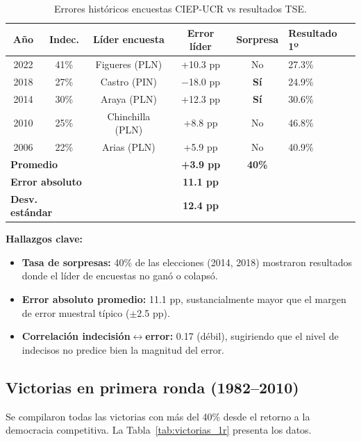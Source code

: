 \documentclass[11pt,a4paper]{article}
\begin{document}
\begin{table}[H]
\centering
\caption{Errores históricos encuestas CIEP-UCR vs resultados TSE.}
\label{tab:errores_historicos}
\begin{tabular}{@{}cccccl@{}}
\toprule
\textbf{Año} & \textbf{Indec.} & \textbf{Líder encuesta} & \textbf{Error líder} & \textbf{Sorpresa} & \textbf{Resultado 1º} \\
\midrule
2022 & 41\% & Figueres (PLN) & +10.3 pp & No & 27.3\% \\
2018 & 27\% & Castro (PIN) & $-$18.0 pp & \textbf{Sí} & 24.9\% \\
2014 & 30\% & Araya (PLN) & +12.3 pp & \textbf{Sí} & 30.6\% \\
2010 & 25\% & Chinchilla (PLN) & +8.8 pp & No & 46.8\% \\
2006 & 22\% & Arias (PLN) & +5.9 pp & No & 40.9\% \\
\midrule
\multicolumn{2}{l}{\textbf{Promedio}} & & \textbf{+3.9 pp} & \textbf{40\%} & \\
\multicolumn{2}{l}{\textbf{Error absoluto}} & & \textbf{11.1 pp} & & \\
\multicolumn{2}{l}{\textbf{Desv. estándar}} & & \textbf{12.4 pp} & & \\
\bottomrule
\end{tabular}
\end{table}

\textbf{Hallazgos clave:}
\begin{itemize}
    \item \textbf{Tasa de sorpresas:} 40\% de las elecciones (2014, 2018) mostraron resultados donde el líder de encuestas no ganó o colapsó.
    \item \textbf{Error absoluto promedio:} 11.1 pp, sustancialmente mayor que el margen de error muestral típico ($\pm$2.5 pp).
    \item \textbf{Correlación indecisión$\leftrightarrow$error:} 0.17 (débil), sugiriendo que el nivel de indecisos no predice bien la magnitud del error.
\end{itemize}

\subsection{Victorias en primera ronda (1982--2010)}

Se compilaron todas las victorias con más del 40\% desde el retorno a la democracia competitiva. La Tabla~\ref{tab:victorias_1r} presenta los datos.
\end{document}
